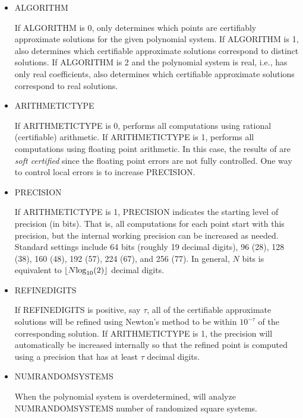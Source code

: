 \documentclass[11pt]{report}
\begin{document}
\vskip 0.1in
\begin{itemize}

\item ALGORITHM

If ALGORITHM is 0, \alphaCertifiedS only determines which points are certifiably approximate solutions for the given polynomial system.
If ALGORITHM is 1, \alphaCertifiedS also determines which certifiable approximate solutions correspond to distinct solutions.
If ALGORITHM is 2 and the polynomial system is real, i.e., has only real coefficients, \alphaCertifiedS
also determines which certifiable approximate solutions correspond to real solutions.

\item ARITHMETICTYPE

If ARITHMETICTYPE is 0, \alphaCertifiedS performs all computations using rational (certifiable) arithmetic.
If ARITHMETICTYPE is 1, \alphaCertifiedS performs all computations using floating point arithmetic.
In this case, the results of \alphaCertifiedS are {\it soft certified} since the floating point errors
are not fully controlled.  One way to control local errors is to increase PRECISION.

\item PRECISION

If ARITHMETICTYPE is 1, PRECISION indicates the starting level of precision (in bits).
That is, all computations for each point start with this precision, but the internal working precision
can be increased as needed.
Standard settings include 64 bits (roughly 19 decimal digits), 96 (28), 128 (38), 160 (48), 192 (57), 224 (67), and 256 (77).
In general, $N$ bits is equivalent to $\left\lfloor N\hbox{log}_{10}(2)\right\rfloor$ decimal digits.

\item REFINEDIGITS

If REFINEDIGITS is positive, say $\tau$, all of the certifiable approximate solutions will be refined
using Newton's method to be within $10^{-\tau}$ of the corresponding solution.  If ARITHMETICTYPE is 1,
the precision will automatically be increased internally so that the refined point is computed using
a precision that has at least $\tau$ decimal digits.

\item NUMRANDOMSYSTEMS

When the polynomial system is overdetermined, \alphaCertifiedS will analyze NUMRANDOMSYSTEMS
number of randomized square systems.


\end{itemize}
\end{document}
